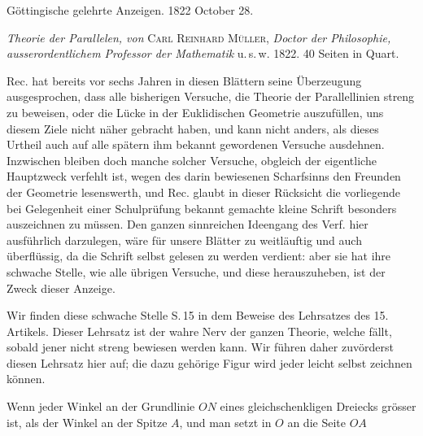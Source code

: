 \clearpage
\begin{center}
{\Large{}}
\end{center}

\bigskip
\noindent\hrulefill

\begin{center}
Göttingische gelehrte Anzeigen. 1822 October 28.
\end{center}

\noindent\hrulefill
\bigskip

\begin{center}
\end{center}

\emph{Theorie der Parallelen, von} \textsc{Carl Reinhard Müller}, \emph{Doctor der Philosophie, ausserordentlichem Professor der Mathematik} u.\,s.\,w. 1822. 40 Seiten in Quart.

Rec. hat bereits vor sechs Jahren in diesen Blättern seine Überzeugung ausgesprochen, dass alle bisherigen Versuche, die Theorie der Parallellinien streng zu beweisen, oder die Lücke in der Euklidischen Geometrie auszufüllen, uns diesem Ziele nicht näher gebracht haben, und kann nicht anders, als dieses Urtheil auch auf alle spätern ihm bekannt gewordenen Versuche ausdehnen. Inzwischen bleiben doch manche solcher Versuche, obgleich der eigentliche Hauptzweck verfehlt ist, wegen des darin bewiesenen Scharfsinns den Freunden der Geometrie lesenswerth, und Rec. glaubt in dieser Rücksicht die vorliegende bei Gelegenheit einer Schulprüfung bekannt gemachte kleine Schrift besonders auszeichnen zu müssen. Den ganzen sinnreichen Ideengang des Verf. hier ausführlich darzulegen, wäre für unsere Blätter zu weitläuftig und auch überflüssig, da die Schrift selbst gelesen zu werden verdient: aber sie hat ihre schwache Stelle, wie alle übrigen Versuche, und diese herauszuheben, ist der Zweck dieser Anzeige.

Wir finden diese schwache Stelle S.\,15 in dem Beweise des Lehrsatzes des 15. Artikels. Dieser Lehrsatz ist der wahre Nerv der ganzen Theorie, welche fällt, sobald jener nicht streng bewiesen werden kann. Wir führen daher zuvörderst diesen Lehrsatz hier auf; die dazu gehörige Figur wird jeder leicht selbst zeichnen können.

Wenn jeder Winkel an der Grundlinie $ON$ eines gleichschenkligen Dreiecks grösser ist, als der Winkel an der Spitze $A$, und man setzt in $O$ an die Seite $OA$
